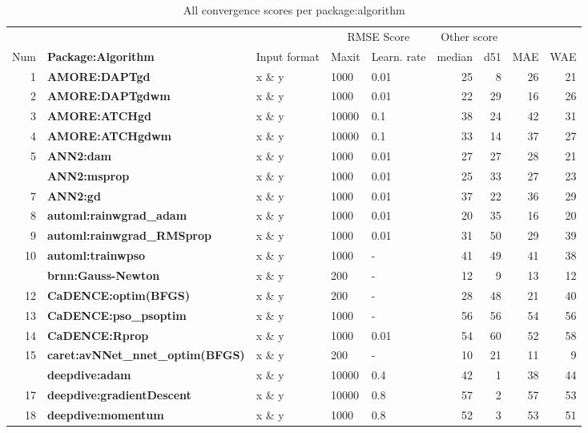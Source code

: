 \begin{Schunk}
\begin{table}

\caption{\label{tab:unnamed-chunk-4}All convergence scores per package:algorithm}
\centering
\fontsize{8}{10}\selectfont
\begin{tabular}[t]{r>{\bfseries}llllrrrr}
\toprule
\multicolumn{2}{c}{ } & \multicolumn{3}{c}{Input parameter} & \multicolumn{2}{c}{RMSE Score} & \multicolumn{2}{c}{Other score} \\
\cmidrule(l{3pt}r{3pt}){3-5} \cmidrule(l{3pt}r{3pt}){6-7} \cmidrule(l{3pt}r{3pt}){8-9}
Num & Package:Algorithm & Input format & Maxit & Learn. rate & median & d51 & MAE & WAE\\
\midrule
1 & AMORE:DAPTgd & x \& y & 1000 & 0.01 & 25 & 8 & 26 & 21\\
2 & AMORE:DAPTgdwm & x \& y & 1000 & 0.01 & 22 & 29 & 16 & 26\\
3 & AMORE:ATCHgd & x \& y & 10000 & 0.1 & 38 & 24 & 42 & 31\\
4 & AMORE:ATCHgdwm & x \& y & 10000 & 0.1 & 33 & 14 & 37 & 27\\
5 & ANN2:dam & x \& y & 1000 & 0.01 & 27 & 27 & 28 & 21\\
\addlinespace
6 & ANN2:msprop & x \& y & 1000 & 0.01 & 25 & 33 & 27 & 23\\
7 & ANN2:gd & x \& y & 1000 & 0.01 & 37 & 22 & 36 & 29\\
8 & automl:rainwgrad\_adam & x \& y & 1000 & 0.01 & 20 & 35 & 16 & 20\\
9 & automl:rainwgrad\_RMSprop & x \& y & 1000 & 0.01 & 31 & 50 & 29 & 39\\
10 & automl:trainwpso & x \& y & 1000 & - & 41 & 49 & 41 & 38\\
\addlinespace
11 & brnn:Gauss-Newton & x \& y & 200 & - & 12 & 9 & 13 & 12\\
12 & CaDENCE:optim(BFGS) & x \& y & 200 & - & 28 & 48 & 21 & 40\\
13 & CaDENCE:pso\_psoptim & x \& y & 1000 & - & 56 & 56 & 54 & 56\\
14 & CaDENCE:Rprop & x \& y & 1000 & 0.01 & 54 & 60 & 52 & 58\\
15 & caret:avNNet\_nnet\_optim(BFGS) & x \& y & 200 & - & 10 & 21 & 11 & 9\\
\addlinespace
16 & deepdive:adam & x \& y & 10000 & 0.4 & 42 & 1 & 38 & 44\\
17 & deepdive:gradientDescent & x \& y & 10000 & 0.8 & 57 & 2 & 57 & 53\\
18 & deepdive:momentum & x \& y & 1000 & 0.8 & 52 & 3 & 53 & 51\\

\end{tabular}
\end{table}
\end{Schunk}

